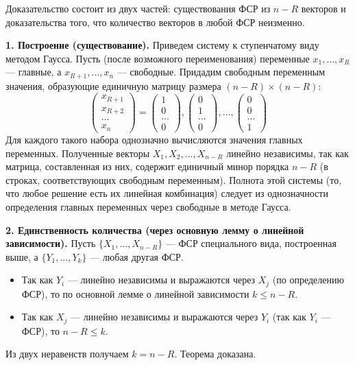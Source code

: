 \begin{tcolorbox}[title=Доказательство, breakable]
Доказательство состоит из двух частей: существования ФСР из $n-R$ векторов и доказательства того, что количество векторов в любой ФСР неизменно.

\textbf{1. Построение (существование).}
Приведем систему к ступенчатому виду методом Гаусса. Пусть (после возможного переименования) переменные $x_1, \dots, x_R$ --- главные, а $x_{R+1}, \dots, x_n$ --- свободные. Придадим свободным переменным значения, образующие единичную матрицу размера $(n-R) \times (n-R)$:
\[
\begin{pmatrix} x_{R+1} \\ x_{R+2} \\ \dots \\ x_n \end{pmatrix} = 
\begin{pmatrix} 1 \\ 0 \\ \dots \\ 0 \end{pmatrix}, 
\begin{pmatrix} 0 \\ 1 \\ \dots \\ 0 \end{pmatrix}, \dots,
\begin{pmatrix} 0 \\ 0 \\ \dots \\ 1 \end{pmatrix}
\]
Для каждого такого набора однозначно вычисляются значения главных переменных. Полученные векторы $X_1, X_2, \dots, X_{n-R}$ линейно независимы, так как матрица, составленная из них, содержит единичный минор порядка $n-R$ (в строках, соответствующих свободным переменным). Полнота этой системы (то, что любое решение есть их линейная комбинация) следует из однозначности определения главных переменных через свободные в методе Гаусса.

\textbf{2. Единственность количества (через основную лемму о линейной зависимости).}
Пусть $\{X_1, \dots, X_{n-R}\}$ --- ФСР специального вида, построенная выше, а $\{Y_1, \dots, Y_k\}$ --- любая другая ФСР.
\begin{itemize}
    \item Так как $Y_i$ --- линейно независимы и выражаются через $X_j$ (по определению ФСР), то по основной лемме о линейной зависимости $k \le n-R$.
    \item Так как $X_j$ --- линейно независимы и выражаются через $Y_i$ (так как $Y_i$ --- ФСР), то $n-R \le k$.
\end{itemize}
Из двух неравенств получаем $k = n-R$. Теорема доказана.
\end{tcolorbox}

